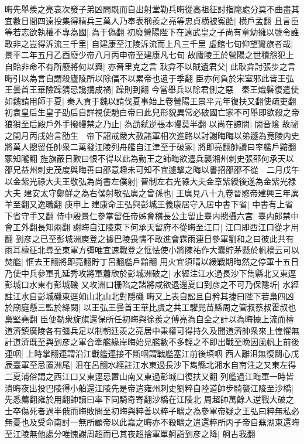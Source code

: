 晦先舉羨之亮哀次發子弟凶問既而自出射堂勒兵晦從高祖征討指麾處分莫不曲盡其宜數日間四遠投集得精兵三萬人乃奉表稱羨之亮等忠貞横被寃酷|{
	横戶孟翻}
且言臣等若志欲執權不專為國|{
	為于偽翻}
初廢營陽陛下在遠武皇之子尚有童幼擁以號令誰敢非之豈得泝流三千里|{
	自建康至江陵泝流而上凡三千里}
虚館七旬仰望鸞旗者哉|{
	景平二年五月乙酉廢少帝八月丙申帝至建康凡七旬}
故廬陵王於營陽之世積怨犯上自貽非命不有所廢將何以興|{
	亦晉里克之言}
耿弇不以賊遺君父|{
	此耿弇討張步之言晦引以為言自謂殺廬陵所以除偪不以累帝也遺于季翻}
臣亦何負於宋室邪此皆王弘王曇首王華險躁猜忌讒搆成禍|{
	躁則到翻}
今當舉兵以除君側之惡　秦王熾磐復遣使如魏請用師于夏|{
	秦入貢于魏以請伐夏事始上卷營陽王景平元年復扶又翻使疏吏翻}
初袁皇后生皇子劭后自詳視使馳白帝曰此兒形貌異常必破國亡家不可舉即欲殺之帝狼狽至后殿戶外手撥幔禁之乃止|{
	為劭弑逆張本幔莫半翻}
以尚在諒闇|{
	闇音隂}
故祕之閏月丙戌始言劭生　帝下詔戒嚴大赦諸軍相次進路以討謝晦晦以弟遯為竟陵内史將萬人摠留任帥衆二萬發江陵列舟艦自江津至于破冢|{
	將即亮翻帥讀曰率艦戶黯翻冢知隴翻}
旌旗蔽日歎曰恨不得以此為勤王之師晦欲遣兵襲湘州刺史張邵何承天以邵兄益州刺史茂度與晦善曰邵意趣未可知不宜遽擊之晦以書招邵邵不從　二月戊午以金紫光祿大夫王敬弘為尚書左僕射|{
	晉制左右光祿大夫金章紫綬後遂為金紫光禄大夫}
建安太守鄭鮮之為右僕射敬弘廙之曾孫也|{
	王廙見八十九卷晉愍帝建興三年廙羊至翻又逸職翻}
庚申上建康命王弘與彭城王義康居守入居中書下省|{
	中書有上省下省守手又翻}
侍中殷景仁參掌留任帝姊會稽長公主留止臺内摠攝六宫|{
	臺内郎禁中會工外翻長知兩翻}
謝晦自江陵東下何承天留府不從晦至江口|{
	江口即西江口從才用翻}
到彦之已至彭城洲庾登之據巴陵畏懦不敢進會霖雨連日參軍劉和之曰彼此共有雨耳檀征北尋至東軍方彊唯宜速戰登之恇怯使小將陳祐作大囊貯茅懸於帆檣云可以焚艦|{
	恇去王翻將即亮翻貯丁呂翻艦戶黯翻}
用火宜須晴以緩戰期晦然之停軍十五日乃使中兵參軍孔延秀攻將軍蕭欣於彭城洲破之|{
	水經注江水過長沙下雋縣北又東逕彭城口水東冇彭城磯}
又攻洲口栅陷之諸將咸欲退還夏口到彦之不可乃保隱圻|{
	水經註江水自彭城磯東逕如山北山北對隱磯}
晦又上表自訟且自矜其捷曰陛下若梟四凶於廟庭懸三監於絳闕|{
	以王弘王曇首王華比虞之共工驩兜苗鯀周之管叔蔡叔霍叔也梟堅堯翻}
臣便勒衆旋旗還保所任初晦與徐羨之傅亮為自全之計以為晦據上流而檀道濟鎮廣陵各有彊兵足以制朝廷羨之亮居中秉權可得持久及聞道濟帥衆來上惶懼無計道濟既至與到彦之軍合牽艦緣岸晦始見艦數不多輕之不即出戰至晩因風帆上前後連咽|{
	上時掌翻連謂沿江戰艦連接不斷咽謂戰艦塞江前後填咽}
西人離沮無復鬬心戊辰臺軍至忌置洲尾|{
	沮在呂翻水經註江水東過長沙下雋縣北湘水自南注之又東左得二夏浦俗謂之西江口又東逕忌置山南又東過彭城口復扶又翻}
列艦過江晦軍一時皆潰晦夜出投巴陵得小船還江陵先是帝遣雍州刺史劉粹自陸道帥步騎襲江陵至沙橋|{
	先悉薦翻雍於用翻帥讀曰率下同騎奇寄翻沙橋在江陵北}
周超帥萬餘人逆戰大破之士卒傷死者過半俄而晦敗問至初晦與粹善以粹子曠之為參軍帝疑之王弘曰粹無私必無憂也及受命南討一無所顧帝以此嘉之晦亦不殺曠之遣還粹所丙子帝自蕪湖東還晦至江陵無他處分唯愧謝周超而已其夜超捨軍單舸詣到彦之降|{
	舸古我翻}
